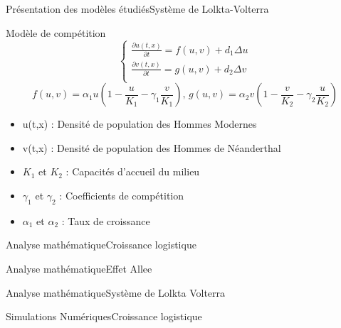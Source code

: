\documentclass[10pt]{beamer}
\begin{document}
\begin{frame}{Présentation des modèles étudiés}{Système de Lolkta-Volterra}
\begin{block}{Modèle de compétition}
	$$\begin{cases} \frac{\partial u(t,x)}{\partial t} = f(u,v) + d_1\Delta u\\ \frac{\partial v(t,x)}{\partial t} = g(u,v) + d_2 \Delta v \\ 
\end{cases}$$
	$$f(u,v) = \alpha_1 u\left(1-\frac{u}{K_1}-\gamma_1\frac{v}{K_1}\right) \text{, } g(u,v) = \alpha_2 v\left(1-\frac{v}{K_2}-\gamma_2\frac{u}{K_2}\right)$$
\end{block}
\begin{itemize}
	\item u(t,x) : Densité de population des Hommes Modernes 
    \item v(t,x) : Densité de population des Hommes de Néanderthal 
    \item $K_1$ et $K_2$ : Capacités d'accueil du milieu
    \item $\gamma_1$ et $\gamma_2$ : Coefficients de compétition
    \item $\alpha_1$ et $\alpha_2$ : Taux de croissance
\end{itemize}
\end{frame}

\begin{frame}{Analyse mathématique}{Croissance logistique}
\end{frame}

\begin{frame}{Analyse mathématique}{Effet Allee}
\end{frame}

\begin{frame}{Analyse mathématique}{Système de Lolkta Volterra}
\end{frame}

\begin{frame}{Simulations Numériques}{Croissance logistique}
\end{frame}
\end{document}
